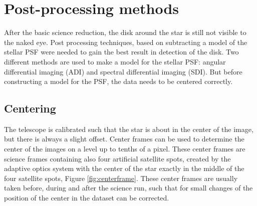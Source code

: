 \documentclass[twoside,single]{lion-msc}
\begin{document}
\section{Post-processing methods}
After the basic science reduction, the disk around the star is still not visible to the naked eye. Post processing techniques, based on subtracting a model of the stellar PSF were needed to gain the best result in detection of the disk. Two different methods are used to make a model for the stellar PSF: angular differential imaging (ADI) and spectral differential imaging (SDI). But before constructing a model for the PSF, the data needs to be centered correctly.

\subsection{Centering}
The telescope is calibrated such that the star is about in the center of the image, but there is always a slight offset. Center frames can be used to determine the center of the images on a level up to tenths of a pixel. These center frames are science frames containing also four artificial satellite spots, created by the adaptive optics system with the center of the star exactly in the middle of the four satellite spots, Figure \ref{fig:centerframe}. These center frames are usually taken before, during and after the science run, such that for small changes of the position of the center in the dataset can be corrected.
\end{document}
